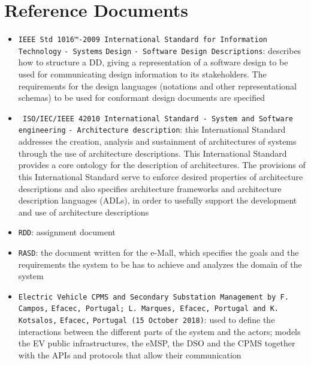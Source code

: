 \section{Reference Documents}
\label{sec:Reference Documents}%
\begin{itemize}
    \item \verb|IEEE Std 1016™-2009 International Standard for Information Technology| \verb|- Systems| \verb|Design| \verb|- Software Design Descriptions|: describes how to structure a DD, giving a representation of a software design to be used for communicating design information to its stakeholders. The requirements for the design languages (notations and other representational schemas) to be used for conformant design documents are specified
    \item \verb| ISO/IEC/IEEE 42010 International Standard - System and Software |\\\verb|engineering| \verb|- Architecture description|: this International Standard addresses the creation, analysis and sustainment of architectures of systems through the use of architecture descriptions. This International Standard provides a core ontology for the description of architectures. The provisions of this International Standard serve to enforce desired properties of architecture descriptions and also specifies architecture frameworks and architecture description languages (ADLs), in order to usefully support the development and use of architecture descriptions
    \item \verb|RDD|: assignment document
    \item \verb|RASD|: the document written for the e-Mall, which specifies the goals and the requirements the system to be has to achieve and analyzes the domain of the system 
    \item \verb|Electric Vehicle CPMS and Secondary Substation Management by F. Campos,| \verb|Efacec, Portugal; L. Marques, Efacec, Portugal and K. Kotsalos,| \verb|Efacec,| \verb|Portugal (15 October 2018)|: used to define the interactions between the different parts of the system and the actors; models the EV public infrastructures, the eMSP, the DSO and the CPMS together with the APIs and protocols that allow their communication
\end{itemize}

